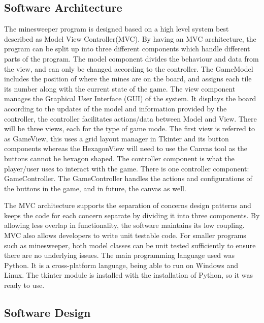 \documentclass[12pt, a4]{report}
\begin{document}
	\subsection{Software Architecture}
	
	\par The minesweeper program is designed based on a high level system best described as Model View Controller(MVC). By having an MVC architecture, the program can be split up into three different components which handle different parts of the program. The model component divides the behaviour and data from the view, and can only be changed according to the controller. The GameModel includes the position of where the mines are on the board, and assigns each tile its number along with the current state of the game. The view component manages the Graphical User Interface (GUI) of the system. It displays the board according to the updates of the model and information provided by the controller, the controller facilitates actions/data between Model and View. There will be three views, each for the type of game mode. The first view is referred to as GameView, this uses a grid layout manager in Tkinter and its button components whereas the HexagonView will need to use the Canvas tool as the buttons cannot be hexagon shaped. The controller component is what the player/user uses to interact with the game. There is one controller component: GameController. The GameController handles the actions and configurations of the buttons in the game, and in future, the canvas as well.
	\newline \par 
	The MVC architecture supports the separation of concerns design patterns and keeps the code for each concern separate by dividing it into three components. By allowing less overlap in functionality, the software maintains its low coupling. MVC also allows developers to write unit testable code. For smaller programs such as minesweeper, both model classes can be unit tested sufficiently to ensure there are no underlying issues. The main programming language used was Python. It is a cross-platform language, being able to run on Windows and Linux. The tkinter module is installed with the installation of Python, so it was ready to use.  

	\pagebreak
	
	\subsection{Software Design}
\end{document}
